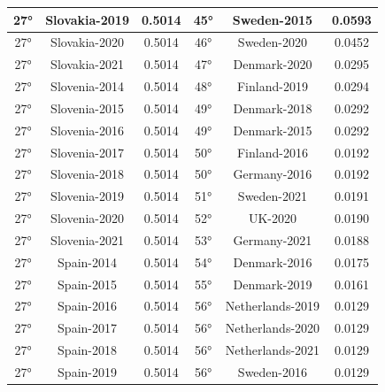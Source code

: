 \documentclass[a4paper,12pt, openright]{report}
\begin{document}
\begin{longtable}[c]{|c|c|c|c|c|c|}
    \hline
    27° & Slovakia-2019 & 0.5014 & 45° & Sweden-2015  & 0.0593 \\ 
    \hline
    27° & Slovakia-2020  & 0.5014& 46° & Sweden-2020 & 0.0452 \\ 
    \hline
    27° & Slovakia-2021 & 0.5014 & 47° & Denmark-2020 & 0.0295 \\
    \hline
    27° & Slovenia-2014 & 0.5014 & 48° & Finland-2019 & 0.0294 \\ 
    \hline
    27° & Slovenia-2015 & 0.5014 & 49° & Denmark-2018 & 0.0292 \\
    \hline
    27° & Slovenia-2016 & 0.5014 & 49° & Denmark-2015  & 0.0292 \\
    \hline
    27° & Slovenia-2017  & 0.5014 & 50° & Finland-2016 & 0.0192 \\
    \hline
    27° & Slovenia-2018 & 0.5014 & 50° & Germany-2016 & 0.0192 \\
    \hline
    27° & Slovenia-2019 & 0.5014 & 51° & Sweden-2021 & 0.0191 \\
    \hline
    27° & Slovenia-2020 & 0.5014 & 52° & UK-2020 & 0.0190 \\
    \hline
    27° & Slovenia-2021 & 0.5014 & 53° & Germany-2021  & 0.0188 \\
    \hline
    27° & Spain-2014  & 0.5014 & 54° & Denmark-2016 & 0.0175 \\
    \hline
    27° & Spain-2015 & 0.5014 & 55° & Denmark-2019 & 0.0161 \\
    \hline
    27° & Spain-2016 & 0.5014 & 56° & Netherlands-2019 & 0.0129 \\
    \hline 
    27° & Spain-2017 & 0.5014 & 56° & Netherlands-2020 & 0.0129 \\
    \hline
    27° & Spain-2018 & 0.5014 & 56° & Netherlands-2021  & 0.0129 \\
    \hline
    27° & Spain-2019  & 0.5014 & 56° & Sweden-2016 & 0.0129 \\
    \hline
\end{longtable}
\end{document}
